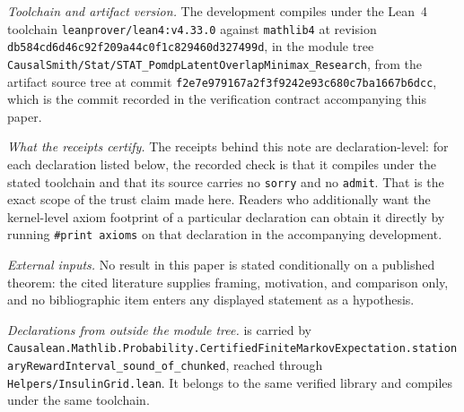 \documentclass[11pt]{article}
\begin{document}
\emph{Toolchain and artifact version.} The development compiles under the Lean~4 toolchain \texttt{leanprover/lean4:v4.33.0} against \texttt{mathlib4} at revision \texttt{db584cd6d46c92f209a44c0f1c829460d327499d}, in the module tree \texttt{CausalSmith/Stat/STAT\_PomdpLatentOverlapMinimax\_Research}, from the artifact source tree at commit \texttt{f2e7e979167a2f3f9242e93c680c7ba1667b6dcc}, which is the commit recorded in the verification contract accompanying this paper.

\emph{What the receipts certify.} The receipts behind this note are declaration-level: for each declaration listed below, the recorded check is that it compiles under the stated toolchain and that its source carries no \texttt{sorry} and no \texttt{admit}. That is the exact scope of the trust claim made here. Readers who additionally want the kernel-level axiom footprint of a particular declaration can obtain it directly by running \texttt{\#print axioms} on that declaration in the accompanying development.

\emph{External inputs.} No result in this paper is stated conditionally on a published theorem: the cited literature supplies framing, motivation, and comparison only, and no bibliographic item enters any displayed statement as a hypothesis.

\emph{Declarations from outside the module tree.}  is carried by \texttt{Causalean.\allowbreak Mathlib.\allowbreak Probability.\allowbreak CertifiedFiniteMarkovExpectation.\allowbreak stationaryRewardInterval\_sound\_of\_chunked}, reached through \texttt{Helpers/InsulinGrid.lean}. It belongs to the same verified library and compiles under the same toolchain.
\end{document}
